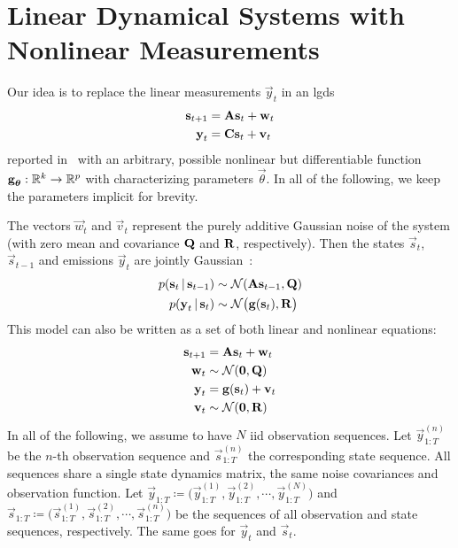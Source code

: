 \section{Linear Dynamical Systems with Nonlinear Measurements}
\label{subsec:slds}

Our idea is to replace the linear measurements \( \vec{y}_t \) in an \ac{lgds}
\begin{align*}
	\boldsymbol{\mathrm{s}}_{t + 1} & = \boldsymbol{\mathrm{A}} \boldsymbol{\mathrm{s}}_t + \boldsymbol{\mathrm{w}}_t \\
	\boldsymbol{\mathrm{y}}_t       & = \boldsymbol{\mathrm{C}} \boldsymbol{\mathrm{s}}_t + \boldsymbol{\mathrm{v}}_t
\end{align*}
reported in~\cite{ghahramaniParameterEstimationLinear1996} with an arbitrary, possible nonlinear but differentiable function \( \boldsymbol{\mathrm{g}}_{\boldsymbol{\mathrm{\theta}}} : \mathbb{R}^k \to \mathbb{R}^p \) with characterizing parameters \( \vec{\theta} \). In all of the following, we keep the parameters implicit for brevity.

The vectors \( \vec{w}_t \) and \( \vec{v}_t \) represent the purely additive Gaussian noise of the system (with zero mean and covariance \( \boldsymbol{\mathrm{Q}} \) and \( \boldsymbol{\mathrm{R}} \), respectively). Then the states \( \vec{s}_t \), \( \vec{s}_{t - 1} \) and emissions \( \vec{y}_t \) are jointly Gaussian~\cite{minkaHiddenMarkovModels1999}:
\begin{align*}
	p(\boldsymbol{\mathrm{s}}_t \,\vert\, \boldsymbol{\mathrm{s}}_{t - 1}) & \sim \mathcal{N}(\boldsymbol{\mathrm{A}} \boldsymbol{\mathrm{s}}_{t - 1}, \boldsymbol{\mathrm{Q}})    \\
	p(\boldsymbol{\mathrm{y}}_t \,\vert\, \boldsymbol{\mathrm{s}}_t)       & \sim \mathcal{N}\big(\boldsymbol{\mathrm{g}}(\boldsymbol{\mathrm{s}}_t), \boldsymbol{\mathrm{R}}\big)
\end{align*}
This model can also be written as a set of both linear and nonlinear equations:
\begin{align*}
	\boldsymbol{\mathrm{s}}_{t + 1} & = \boldsymbol{\mathrm{A}} \boldsymbol{\mathrm{s}}_t + \boldsymbol{\mathrm{w}}_t  \\
	\boldsymbol{\mathrm{w}}_t       & \sim \mathcal{N}(\boldsymbol{\mathrm{0}}, \boldsymbol{\mathrm{Q}})   \\
	\boldsymbol{\mathrm{y}}_t       & = \boldsymbol{\mathrm{g}}(\boldsymbol{\mathrm{s}}_t) + \boldsymbol{\mathrm{v}}_t \\
	\boldsymbol{\mathrm{v}}_t       & \sim \mathcal{N}(\boldsymbol{\mathrm{0}}, \boldsymbol{\mathrm{R}})
\end{align*}
In all of the following, we assume to have \(N\) \ac{iid} observation sequences. Let \( \vec{y}_{1:T}^{(n)} \) be the \(n\)-th observation sequence and \( \vec{s}_{1:T}^{(n)} \) the corresponding state sequence. All sequences share a single state dynamics matrix, the same noise covariances and observation function. Let \( \vec{y}_{1:T} \coloneqq \big(\vec{y}_{1:T}^{(1)}, \vec{y}_{1:T}^{(2)}, \cdots, \vec{y}_{1:T}^{(N)}\big) \) and \( \vec{s}_{1:T} \coloneqq \big(\vec{s}_{1:T}^{(1)}, \vec{s}_{1:T}^{(2)}, \cdots, \vec{s}_{1:T}^{(n)}\big) \) be the sequences of all observation and state sequences, respectively. The same goes for \( \vec{y}_t \) and \( \vec{s}_t \).


